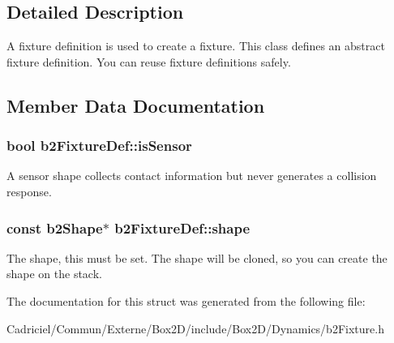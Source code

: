 \subsection{Detailed Description}
A fixture definition is used to create a fixture. This class defines an abstract fixture definition. You can reuse fixture definitions safely. 

\subsection{Member Data Documentation}
\subsubsection[{\texorpdfstring{is\+Sensor}{isSensor}}]{\setlength{\rightskip}{0pt plus 5cm}bool b2\+Fixture\+Def\+::is\+Sensor}\hypertarget{structb2_fixture_def_ac8cfcc6208663c92861eaab3b3fdc57e}{}\label{structb2_fixture_def_ac8cfcc6208663c92861eaab3b3fdc57e}
A sensor shape collects contact information but never generates a collision response. 
\subsubsection[{\texorpdfstring{shape}{shape}}]{\setlength{\rightskip}{0pt plus 5cm}const {\bf b2\+Shape}$\ast$ b2\+Fixture\+Def\+::shape}\hypertarget{structb2_fixture_def_a1e41753d89abf3443e7897e2498a3240}{}\label{structb2_fixture_def_a1e41753d89abf3443e7897e2498a3240}
The shape, this must be set. The shape will be cloned, so you can create the shape on the stack. 

The documentation for this struct was generated from the following file\+:\begin{DoxyCompactItemize}
\item 
Cadriciel/\+Commun/\+Externe/\+Box2\+D/include/\+Box2\+D/\+Dynamics/b2\+Fixture.\+h\end{DoxyCompactItemize}

